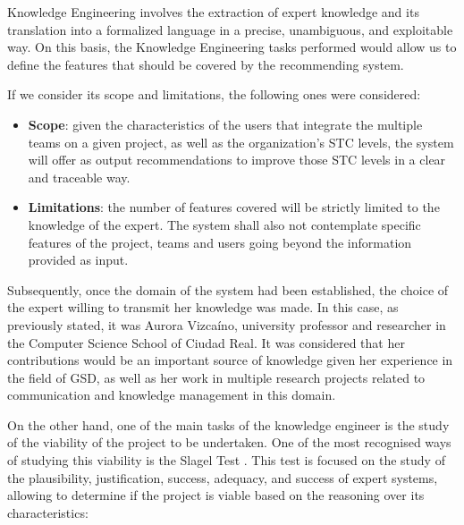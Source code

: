 Knowledge Engineering involves the extraction of expert knowledge and its translation into a formalized language in a precise, unambiguous, and exploitable way. On this basis, the Knowledge Engineering tasks performed would allow us to define the features that should be covered by the recommending system. 

If we consider its scope and limitations, the following ones were considered:

\begin{itemize}
	\item \textbf{Scope}: given the characteristics of the users that integrate the multiple teams on a given project, as well as the organization's STC levels, the system will offer as output recommendations to improve those STC levels in a clear and traceable way.
	\item \textbf{Limitations}: the number of features covered will be strictly limited to the knowledge of the expert. The system shall also not contemplate specific features of the project, teams and users going beyond the information provided as input.
\end{itemize}

Subsequently, once the domain of the system had been established, the choice of the expert willing to transmit her knowledge was made. In this case, as previously stated, it was Aurora Vizcaíno, university professor and researcher in the Computer Science School of Ciudad Real. It was considered that her contributions would be an important source of knowledge given her experience in the field of GSD, as well as her work in multiple research projects related to communication and knowledge management in this domain.

On the other hand, one of the main tasks of the knowledge engineer is the study of the viability of the project to be undertaken. One of the most recognised ways of studying this viability is the Slagel Test \cite{mate_1998}. This test is focused on the study of the plausibility, justification, success, adequacy, and success of expert systems, allowing to determine if the project is viable based on the reasoning over its characteristics:

